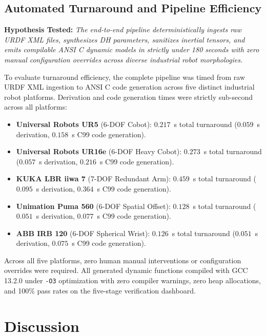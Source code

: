 \documentclass[fleqn,10pt]{article}
\begin{document}
\subsection{Automated Turnaround and Pipeline Efficiency}

\noindent\textbf{Hypothesis Tested:} \textit{The end-to-end pipeline deterministically ingests raw URDF XML files, synthesizes DH parameters, sanitizes inertial tensors, and emits compilable ANSI C dynamic models in strictly under 180 seconds with zero manual configuration overrides across diverse industrial robot morphologies.}

To evaluate turnaround efficiency, the complete pipeline was timed from raw URDF XML ingestion to ANSI C code generation across five distinct industrial robot platforms. Derivation and code generation times were strictly sub-second across all platforms:
\begin{itemize}
	\item \textbf{Universal Robots UR5} (6-DOF Cobot): $0.217$~s total turnaround ($0.059$~s derivation, $0.158$~s C99 code generation).
	\item \textbf{Universal Robots UR16e} (6-DOF Heavy Cobot): $0.273$~s total turnaround ($0.057$~s derivation, $0.216$~s C99 code generation).
	\item \textbf{KUKA LBR iiwa 7} (7-DOF Redundant Arm): $0.459$~s total turnaround ($0.095$~s derivation, $0.364$~s C99 code generation).
	\item \textbf{Unimation Puma 560} (6-DOF Spatial Offset): $0.128$~s total turnaround ($0.051$~s derivation, $0.077$~s C99 code generation).
	\item \textbf{ABB IRB 120} (6-DOF Spherical Wrist): $0.126$~s total turnaround ($0.051$~s derivation, $0.075$~s C99 code generation).
\end{itemize}
Across all five platforms, zero human manual interventions or configuration overrides were required. All generated dynamic functions compiled with GCC 13.2.0 under \texttt{-O3} optimization with zero compiler warnings, zero heap allocations, and 100\% pass rates on the five-stage verification dashboard.

\section{Discussion} \label{sec:discussion}
\end{document}
